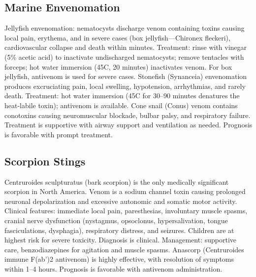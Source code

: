 \subsection{Marine Envenomation}
\label{sec:Marine Envenomation}
Jellyfish envenomation: nematocysts discharge venom containing toxins causing local pain, erythema, and in severe cases (box jellyfish---Chironex fleckeri), cardiovascular collapse and death within minutes. Treatment: rinse with vinegar (5\% acetic acid) to inactivate undischarged nematocysts; remove tentacles with forceps; hot water immersion (45\textdegree C, 20 minutes) inactivates venom. For box jellyfish, antivenom is used for severe cases. Stonefish (Synanceia) envenomation produces excruciating pain, local swelling, hypotension, arrhythmias, and rarely death. Treatment: hot water immersion (45\textdegree C for 30--90 minutes denatures the heat-labile toxin); antivenom is available. Cone snail (Conus) venom contains conotoxins causing neuromuscular blockade, bulbar palsy, and respiratory failure. Treatment is supportive with airway support and ventilation as needed. Prognosis is favorable with prompt treatment.

\subsection{Scorpion Stings}
\label{sec:Scorpion Stings}
Centruroides sculpturatus (bark scorpion) is the only medically significant scorpion in North America. Venom is a sodium channel toxin causing prolonged neuronal depolarization and excessive autonomic and somatic motor activity. Clinical features: immediate local pain, paresthesias, involuntary muscle spasms, cranial nerve dysfunction (nystagmus, opsoclonus, hypersalivation, tongue fasciculations, dysphagia), respiratory distress, and seizures. Children are at highest risk for severe toxicity. Diagnosis is clinical. Management: supportive care, benzodiazepines for agitation and muscle spasms. Anascorp (Centruroides immune F(ab')2 antivenom) is highly effective, with resolution of symptoms within 1--4 hours. Prognosis is favorable with antivenom administration.


